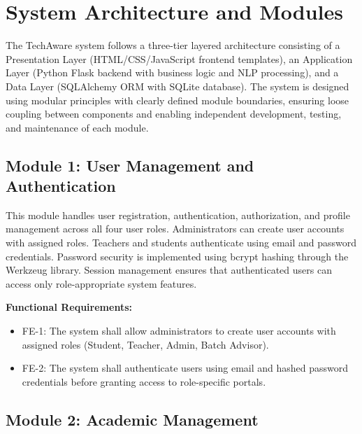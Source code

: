 
\section{System Architecture and Modules}

The TechAware system follows a three-tier layered architecture consisting of a Presentation Layer (HTML/CSS/JavaScript frontend templates), an Application Layer (Python Flask backend with business logic and NLP processing), and a Data Layer (SQLAlchemy ORM with SQLite database). The system is designed using modular principles with clearly defined module boundaries, ensuring loose coupling between components and enabling independent development, testing, and maintenance of each module.




\subsection{Module 1: User Management and Authentication}

This module handles user registration, authentication, authorization, and profile management across all four user roles. Administrators can create user accounts with assigned roles. Teachers and students authenticate using email and password credentials. Password security is implemented using bcrypt hashing through the Werkzeug library. Session management ensures that authenticated users can access only role-appropriate system features.

\textbf{Functional Requirements:}

\begin{itemize}
    \item FE-1: The system shall allow administrators to create user accounts with assigned roles (Student, Teacher, Admin, Batch Advisor).
    \item FE-2: The system shall authenticate users using email and hashed password credentials before granting access to role-specific portals.
\end{itemize}



\subsection{Module 2: Academic Management}

